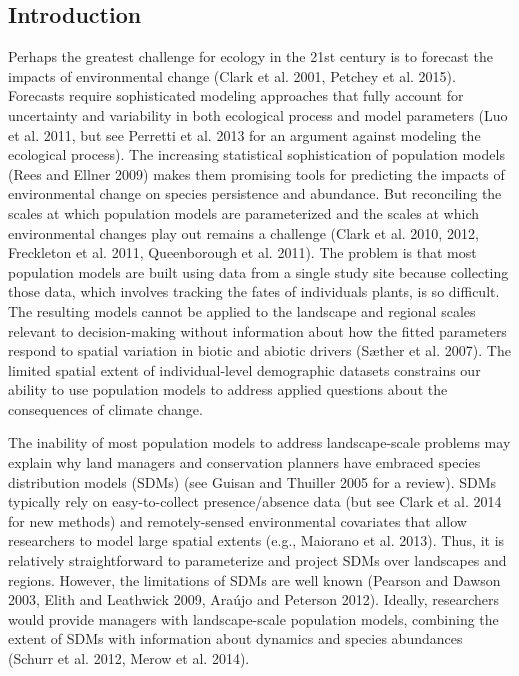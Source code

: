 \documentclass[12pt,]{article}
\begin{document}
\newpage{}

\subsection{Introduction}\label{introduction}

Perhaps the greatest challenge for ecology in the 21st century is to
forecast the impacts of environmental change (Clark et al. 2001, Petchey
et al. 2015). Forecasts require sophisticated modeling approaches that
fully account for uncertainty and variability in both ecological process
and model parameters (Luo et al. 2011, but see Perretti et al. 2013 for
an argument against modeling the ecological process). The increasing
statistical sophistication of population models (Rees and Ellner 2009)
makes them promising tools for predicting the impacts of environmental
change on species persistence and abundance. But reconciling the scales
at which population models are parameterized and the scales at which
environmental changes play out remains a challenge (Clark et al. 2010,
2012, Freckleton et al. 2011, Queenborough et al. 2011). The problem is
that most population models are built using data from a single study
site because collecting those data, which involves tracking the fates of
individuals plants, is so difficult. The resulting models cannot be
applied to the landscape and regional scales relevant to decision-making
without information about how the fitted parameters respond to spatial
variation in biotic and abiotic drivers (Sæther et al. 2007). The
limited spatial extent of individual-level demographic datasets
constrains our ability to use population models to address applied
questions about the consequences of climate change.

The inability of most population models to address landscape-scale
problems may explain why land managers and conservation planners have
embraced species distribution models (SDMs) (see Guisan and Thuiller
2005 for a review). SDMs typically rely on easy-to-collect
presence/absence data (but see Clark et al. 2014 for new methods) and
remotely-sensed environmental covariates that allow researchers to model
large spatial extents (e.g., Maiorano et al. 2013). Thus, it is
relatively straightforward to parameterize and project SDMs over
landscapes and regions. However, the limitations of SDMs are well known
(Pearson and Dawson 2003, Elith and Leathwick 2009, Araújo and Peterson
2012). Ideally, researchers would provide managers with landscape-scale
population models, combining the extent of SDMs with information about
dynamics and species abundances (Schurr et al. 2012, Merow et al. 2014).
\end{document}
